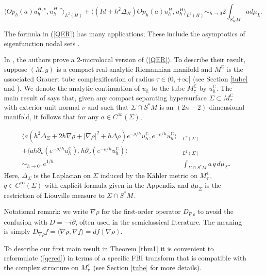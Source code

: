 \documentclass[11pt,reqno]{amsart}
\newcommand{\C}{{\mathbb C}}
\theoremstyle{definition}
\begin{document}
 \begin{equation} \label{QER}
 \langle Op_h(a) u_h^{H,\nu}, u_h^{H,\nu} \rangle_{L^2(H)} + \langle ( Id + h^2 \Delta_H) Op_h(a) u_h^{H}, u_h^{H} \rangle_{L^2(H)} \sim_{h \to 0} 2 \int_{S_H^*M} a d \mu_L. \end{equation}
 
 The formula in (\ref{QER}) has many applications; These include the asymptotics of eigenfunction nodal sets \cite{JZ16}.
 
In \cite{CT24},  the authors prove a 2-microlocal version of (\ref{QER}).  To describe their result, suppose $(M,g)$ is a compact real-analytic Riemannian manifold and $M^{\mathbb{C}}_{\tau}$ is the associated Grauert tube complexification of radius $\tau\in (0,+\infty]$ (see Section \ref{tube} and \cite{Z07}). We denote the analytic continuation of $u_h$ to the tube $M_{\tau}^{\C}$ by $ u_h^{\C}$. The main result of \cite{CT24} says that, given any compact separating hypersurface $\Sigma \subset M_{\tau}^{\C}$ with exterior unit normal $\nu$ and such that $\Sigma \cap S^*M$ is an $(2n-2)$-dimensional manifold, it follows that for any $a \in C^{\infty}(\Sigma),$ 


\begin{equation}\label{qercd}
    \begin{split}
        \langle a(h^2\Delta_{\Sigma}+2h\nabla\rho+|\nabla\rho|^2+h\Delta\rho)e^{-\rho/h}u^{\mathbb{C}}_h,e^{-\rho/h}u^{\mathbb{C}}_h\rangle&_{L^2(\Sigma)}\\
        +\langle ah\partial_\nu (e^{-\rho/h}u^{\mathbb{C}}_h),h\partial_{\nu}(e^{-\rho/h}u^{\mathbb{C}}_h)\rangle&_{L^2(\Sigma)}\\
        \sim_{h\to 0^+}e^{1/h}&\int_{\Sigma\cap S^*M}a  \,q \,d\mu_{\Sigma}.
    \end{split}
\end{equation}
Here,    $\Delta_{\Sigma}$ is the Laplacian on $\Sigma$ induced by the K\"{a}hler metric on $M_{\tau}^{\C}$, $q \in C^{\infty}(\Sigma)$ with explicit formula given in the Appendix and $d\mu_{\Sigma}$ is the restriction of Liouville measure to $\Sigma \cap S^*M.$ 

Notational remark: we write $\nabla\rho$ for the first-order operator $D_{\nabla\rho}$ to avoid the confusion with $D=-i\partial$, often used in the semiclassical literature. The meaning is simply $D_{\nabla\rho} f=\langle \nabla\rho,\nabla f\rangle=df(\nabla\rho)$.

To describe our first main result in Theorem \ref{thm1} it is convenient to reformulate (\ref{qercd}) in terms of a specific FBI transform that is compatible with the complex structure on $M_{\tau}^{\C}$ (see Section \ref{tube} for more details).
\end{document}
